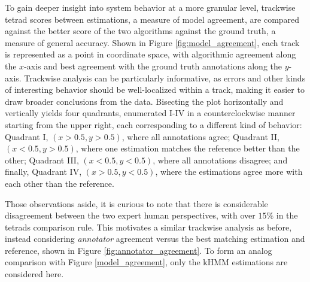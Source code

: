 \documentclass{article}
\begin{document}
To gain deeper insight into system behavior at a more granular level, trackwise tetrad scores between estimations, a measure of model agreement, are compared against the better score of the two algorithms against the ground truth, a measure of general accuracy.
Shown in Figure \ref{fig:model_agreement}, each track is represented as a point in coordinate space, with algorithmic agreement along the $x$-axis and best agreement with the ground truth annotations along the $y$-axis.
Trackwise analysis can be particularly informative, as errors and other kinds of interesting behavior should be well-localized within a track, making it easier to draw broader conclusions from the data.
Bisecting the plot horizontally and vertically yields four quadrants, enumerated I-IV in a counterclockwise manner starting from the upper right, each corresponding to a different kind of behavior:
Quadrant I, $(x > 0.5, y > 0.5)$, where all annotations agree;
Quadrant II, $(x < 0.5, y > 0.5)$, where one estimation matches the reference better than the other;
Quadrant III, $(x < 0.5, y < 0.5)$, where all annotations disagree;
and finally, Quadrant IV, $(x > 0.5, y < 0.5)$, where the estimations agree more with each other than the reference.






Those observations aside, it is curious to note that there is considerable disagreement between the two expert human perspectives, with over $15\%$ in the tetrads comparison rule.
This motivates a similar trackwise analysis as before, instead considering \emph{annotator} agreement versus the best matching estimation and reference, shown in Figure \ref{fig:annotator_agreement}.
To form an analog comparison with Figure \ref{model_agreement}, only the kHMM estimations are considered here.
\end{document}
